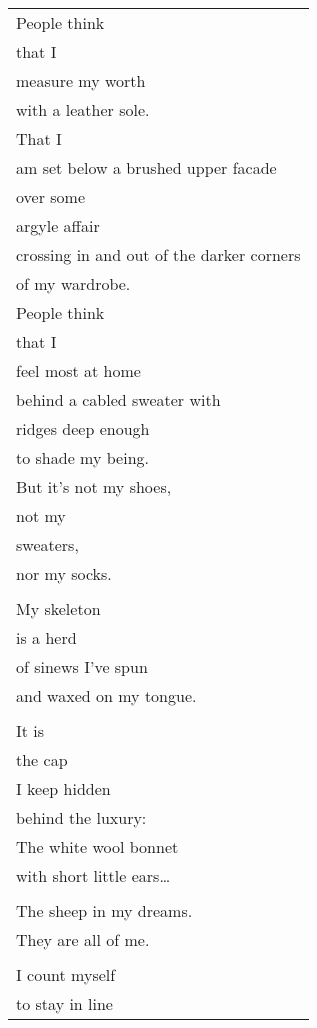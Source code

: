 \documentclass{article}
\begin{document}
\begin{center}
\begin{tabular}{l}
People think \\
that I \\
measure my worth \\
with a leather sole. \\
That I \\
am set below a brushed upper facade \\
over some \\
argyle affair \\
crossing in and out of the darker corners \\
of my wardrobe. \\
People think \\
that I \\
feel most at home \\
behind a cabled sweater with \\
ridges deep enough \\
to shade my being. \\
But it's not my shoes, \\
not my \\
sweaters, \\
nor my socks. \\
\\
My skeleton \\
is a herd \\
of sinews I've spun \\
and waxed on my tongue. \\
\\
It is \\
the cap \\
I keep hidden \\
behind the luxury: \\
The white wool bonnet \\
with short little ears\ldots{} \\
\\
The sheep in my dreams. \\
They are all of me. \\
\\
I count myself \\
to stay in line \\

\end{tabular}
\end{center}
\end{document}
